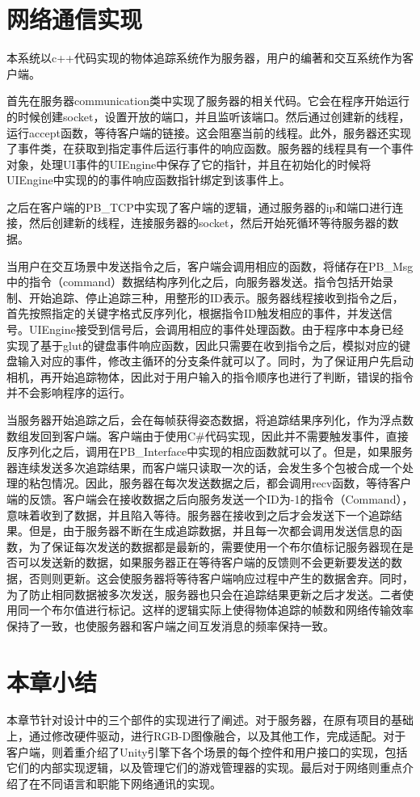 \section{网络通信实现}

本系统以c++代码实现的物体追踪系统作为服务器，用户的编著和交互系统作为客户端。

首先在服务器communication类中实现了服务器的相关代码。它会在程序开始运行的时候创建socket，设置开放的端口，并且监听该端口。然后通过创建新的线程，运行accept函数，等待客户端的链接。这会阻塞当前的线程。此外，服务器还实现了事件类，在获取到指定事件后运行事件的响应函数。服务器的线程具有一个事件对象，处理UI事件的UIEngine中保存了它的指针，并且在初始化的时候将UIEngine中实现的的事件响应函数指针绑定到该事件上。

之后在客户端的PB\_TCP中实现了客户端的逻辑，通过服务器的ip和端口进行连接，然后创建新的线程，连接服务器的socket，然后开始死循环等待服务器的数据。

当用户在交互场景中发送指令之后，客户端会调用相应的函数，将储存在PB\_Msg中的指令（command）数据结构序列化之后，向服务器发送。指令包括开始录制、开始追踪、停止追踪三种，用整形的ID表示。服务器线程接收到指令之后，首先按照指定的关键字格式反序列化，根据指令ID触发相应的事件，并发送信号。UIEngine接受到信号后，会调用相应的事件处理函数。由于程序中本身已经实现了基于glut的键盘事件响应函数，因此只需要在收到指令之后，模拟对应的键盘输入对应的事件，修改主循环的分支条件就可以了。同时，为了保证用户先启动相机，再开始追踪物体，因此对于用户输入的指令顺序也进行了判断，错误的指令并不会影响程序的运行。

当服务器开始追踪之后，会在每帧获得姿态数据，将追踪结果序列化，作为浮点数数组发回到客户端。客户端由于使用C\#代码实现，因此并不需要触发事件，直接反序列化之后，调用在PB\_Interface中实现的相应函数就可以了。但是，如果服务器连续发送多次追踪结果，而客户端只读取一次的话，会发生多个包被合成一个处理的粘包情况。因此，服务器在每次发送数据之后，都会调用recv函数，等待客户端的反馈。客户端会在接收数据之后向服务发送一个ID为-1的指令（Command），意味着收到了数据，并且陷入等待。服务器在接收到之后才会发送下一个追踪结果。但是，由于服务器不断在生成追踪数据，并且每一次都会调用发送信息的函数，为了保证每次发送的数据都是最新的，需要使用一个布尔值标记服务器现在是否可以发送新的数据，如果服务器正在等待客户端的反馈则不会更新要发送的数据，否则则更新。这会使服务器将等待客户端响应过程中产生的数据舍弃。同时，为了防止相同数据被多次发送，服务器也只会在追踪结果更新之后才发送。二者使用同一个布尔值进行标记。这样的逻辑实际上使得物体追踪的帧数和网络传输效率保持了一致，也使服务器和客户端之间互发消息的频率保持一致。

\section{本章小结}
本章节针对设计中的三个部件的实现进行了阐述。对于服务器，在原有项目的基础上，通过修改硬件驱动，进行RGB-D图像融合，以及其他工作，完成适配。对于客户端，则着重介绍了Unity引擎下各个场景的每个控件和用户接口的实现，包括它们的内部实现逻辑，以及管理它们的游戏管理器的实现。最后对于网络则重点介绍了在不同语言和职能下网络通讯的实现。
